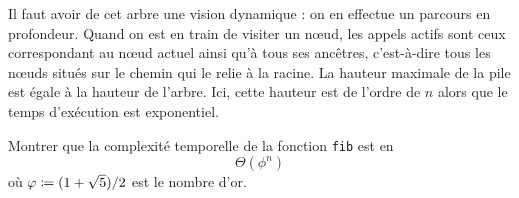 \documentclass{magnolia}
\begin{document}


Il faut avoir de cet arbre une vision dynamique : on en effectue un parcours en
profondeur. Quand on est en train de visiter un n\oe ud, les appels actifs sont
ceux correspondant au n\oe ud actuel ainsi qu'à tous ses ancêtres,
c'est-à-dire
tous les n\oe uds situés sur le chemin qui le relie à la racine.
La hauteur maximale de la pile est égale à la hauteur de l'arbre.
Ici, cette hauteur est de l'ordre de $n$ alors que le temps d'exécution est
exponentiel.\\

\begin{exoUnique}
\exo Montrer que la complexité temporelle de la fonction \verb!fib! est en
\[\Theta(\phi^n)\]
où $\varphi\coloneqq(1+\sqrt{5})/2$ est le nombre d'or.
\end{exoUnique}
\vspace{2ex}
\end{document}
